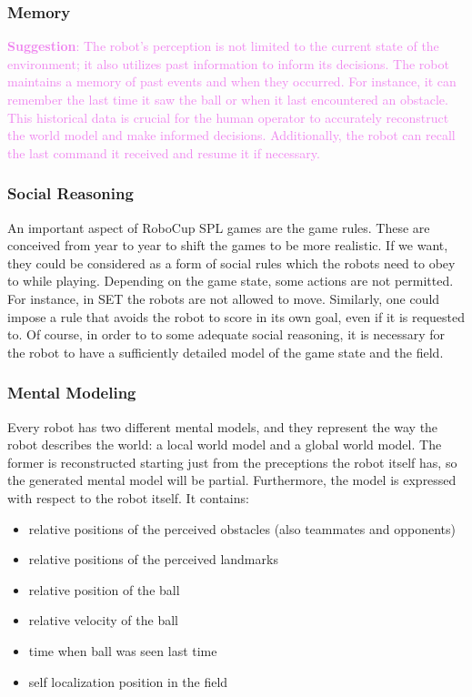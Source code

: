 \documentclass[a4paper, onecolumn, 12pt]{article}
\newcommand\suggestion[1]{\textcolor{violet}{\textbf{Suggestion}: #1}}
\begin{document}
\subsubsection{Memory}
\suggestion{
    The robot's perception is not limited to the current state of the environment; 
    it also utilizes past information to inform its decisions. The robot maintains 
    a memory of past events and when they occurred. For instance, it can remember the 
    last time it saw the ball or when it last encountered an obstacle. This historical 
    data is crucial for the human operator to accurately reconstruct the world model 
    and make informed decisions. Additionally, the robot can recall the last command 
    it received and resume it if necessary.
}

\subsubsection{Social Reasoning}

An important aspect of RoboCup SPL games are the game rules. These are conceived
from year to year to shift the games to be more realistic. If we want, they
could be considered as a form of social rules which the robots need to obey to
while playing. Depending on the game state, some actions are not permitted. For
instance, in SET the robots are not allowed to move. Similarly, one could impose
a rule that avoids the robot to score in its own goal, even if it is requested
to. Of course, in order to to some adequate social reasoning, it is necessary
for the robot to have a sufficiently detailed model of the game state and the
field.

\subsubsection{Mental Modeling}

Every robot has two different mental models, and they represent the way the robot 
describes the world: a local world model and a global world model.
The former is reconstructed starting just from the preceptions the robot itself has,
so the generated mental model will be partial. Furthermore, the model is expressed 
with respect to the robot itself.
It contains:
\begin{itemize}
    \item relative positions of the perceived obstacles (also teammates and opponents)
    \item relative positions of the perceived landmarks
    \item relative position of the ball
    \item relative velocity of the ball
    \item time when ball was seen last time
    \item self localization position in the field
\end{itemize}
\end{document}
